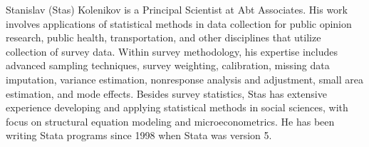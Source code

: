 \begin{aboutauthor}
  Stanislav (Stas) Kolenikov is a Principal Scientist at Abt Associates.
  His work involves applications of statistical methods in data collection
  for public opinion research, public health, transportation, and other disciplines
  that utilize collection of survey data.
  Within survey methodology, his expertise includes advanced sampling techniques,
  survey weighting, calibration, missing data imputation, variance estimation,
  nonresponse analysis and adjustment, small area estimation, and mode effects.
  Besides survey statistics, Stas has extensive experience developing and applying
  statistical methods in social sciences, with focus on structural equation
  modeling and microeconometrics. He has been writing Stata programs since
  1998 when Stata was version 5.
\end{aboutauthor}
